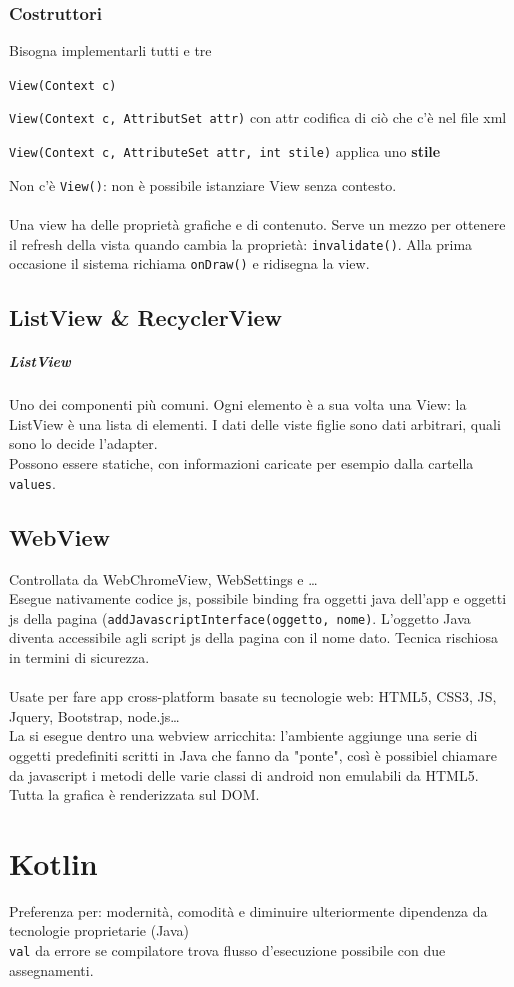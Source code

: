 \documentclass[10pt]{book}
\begin{document}
\subsection{Costruttori}
Bisogna implementarli tutti e tre
\begin{list}{}{}
	\item \texttt{View(Context c)}
	\item \texttt{View(Context c, AttributSet attr)} con attr codifica di ciò che c'è nel file xml
	\item \texttt{View(Context c, AttributeSet attr, int stile)} applica uno \textbf{stile}
\end{list}
Non c'è \texttt{View()}: non è possibile istanziare View senza contesto.\\\\
Una view ha delle proprietà grafiche e di contenuto. Serve un mezzo per ottenere il refresh della vista quando cambia la proprietà: \texttt{invalidate()}. Alla prima occasione il sistema richiama \texttt{onDraw()} e ridisegna la view.

\section{ListView \& RecyclerView}
\paragraph{ListView} Uno dei componenti più comuni. Ogni elemento è a sua volta una View: la ListView è una lista di elementi. I dati delle viste figlie sono dati arbitrari, quali sono lo decide l'adapter.\\
Possono essere statiche, con informazioni caricate per esempio dalla cartella \texttt{values}.
\section{WebView}
Controllata da WebChromeView, WebSettings e \ldots\\
Esegue nativamente codice js, possibile binding fra oggetti java dell'app e oggetti js della pagina (\texttt{addJavascriptInterface(oggetto, nome)}. L'oggetto Java diventa accessibile agli script js della pagina con il nome dato. Tecnica rischiosa in termini di sicurezza.\\\\
Usate per fare app cross-platform basate su tecnologie web: HTML5, CSS3, JS, Jquery, Bootstrap, node.js\ldots\\
La si esegue dentro una webview arricchita: l'ambiente aggiunge una serie di oggetti predefiniti scritti in Java che fanno da "ponte", così è possibiel chiamare da javascript i metodi delle varie classi di android non emulabili da HTML5.\\
Tutta la grafica è renderizzata sul DOM.
\chapter{Kotlin}
Preferenza per: modernità, comodità e diminuire ulteriormente dipendenza da tecnologie proprietarie (Java)\\
\texttt{val} da errore se compilatore trova flusso d'esecuzione possibile con due assegnamenti.
\end{document}
